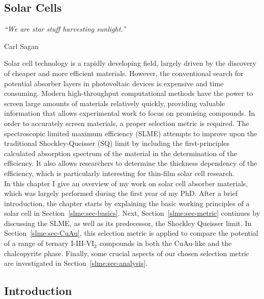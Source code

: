 \begin{refsection} 
 
\chapter{Solar Cells} \label{chapter:slme} 
 
\setlength{\epigraphwidth}{3in} 
\epigraph{\textit{``We are star stuff harvesting sunlight.”}}{Carl Sagan} 
\vspace{3em} 
 
Solar cell technology is a rapidly developing field, largely driven by the 
discovery of cheaper and more efficient materials. However, the conventional 
search for potential absorber layers in photovoltaic devices is expensive and 
time consuming. Modern high-throughput computational methods have the power to 
screen large amounts of materials relatively quickly, providing valuable 
information that allows experimental work to focus on promising compounds. In 
order to accurately screen materials, a proper selection metric is required. 
The spectroscopic limited maximum efficiency (SLME) attempts to improve upon 
the traditional Shockley-Queisser (SQ) limit by including the first-principles 
calculated absorption spectrum of the material in the determination of the 
efficiency. It also allows researchers to determine the thickness dependency 
of the efficiency, which is particularly interesting for thin-film solar cell 
research. \\ 
 
In this chapter I give an overview of my work on solar cell absorber materials, 
which was largely performed during the first year of my PhD. After a brief 
introduction, the chapter
starts by explaining the basic working principles of a solar cell 
in Section~\ref{slme:sec-basics}. Next, Section~\ref{slme:sec-metric} 
continues by discussing the SLME, as well as its predecessor, the Shockley 
Queisser limit. In Section~\ref{slme:sec-CuAu}, this selection metric is 
applied to compare the potential of a range of ternary I-III-VI$_2$ compounds 
in both the CuAu-like and the chalcopyrite phase. Finally, some crucial 
aspects of our chosen selection metric are investigated in 
Section~\ref{slme:sec-analysis}. 
 
\pagebreak 
 
\section{Introduction} 
 

\end{refsection}
